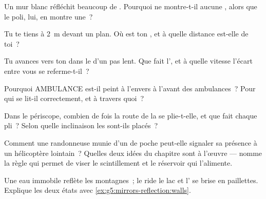 \begin{exercise}[$\star$]\label{exo:g5:mirrors-reflection:2}
Un mur blanc réfléchit beaucoup de . Pourquoi ne montre-t-il
aucune , alors que le  poli, lui, en montre une~?
\end{exercise}

\begin{exercise}[$\star$]\label{exo:g5:mirrors-reflection:3}
Tu te tiens à \qty{2}{m} devant un  plan. Où est ton , et
à quelle distance est-elle de toi~?
\end{exercise}

\begin{exercise}[$\star$]\label{exo:g5:mirrors-reflection:4}
Tu avances vers ton  dans le  d'un pas lent. Que fait
l', et à quelle vitesse l'écart entre vous se referme-t-il~?
\end{exercise}

\begin{exercise}[$\star$]\label{exo:g5:mirrors-reflection:5}
Pourquoi AMBULANCE est-il peint à l'envers à l'avant des
ambulances~? Pour qui se lit-il correctement, et à travers quoi~?
\end{exercise}

\begin{exercise}[$\star$]\label{exo:g5:mirrors-reflection:6}
Dans le périscope, combien de fois la route de la  se plie-t-elle,
et que fait chaque pli~? Selon quelle inclinaison les 
sont-ils placés~?
\end{exercise}

\begin{exercise}[$\star$]\label{exo:g5:mirrors-reflection:7}
Comment une randonneuse munie d'un  de poche peut-elle signaler
sa présence à un hélicoptère lointain~? Quelles deux idées du
chapitre sont à l'œuvre --- nomme la règle qui permet de viser le
scintillement et le réservoir qui l'alimente.
\end{exercise}

\begin{exercise}[$\star$]\label{exo:g5:mirrors-reflection:8}
Une eau immobile reflète les montagnes~; le  ride le lac et
l' se brise en paillettes. Explique les deux états avec
\cref{ex:g5:mirrors-reflection:walls}.
\end{exercise}

